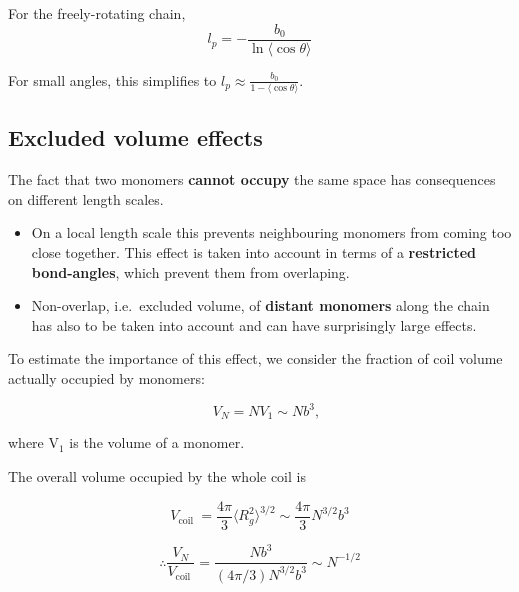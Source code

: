 \documentclass[
  letterpaper,
  enabledeprecatedfontcommands]{report}
\providecommand{\tightlist}{%
  \setlength{\itemsep}{0pt}\setlength{\parskip}{0pt}}
\begin{document}
For the freely-rotating chain, \[
l_p = -\frac{b_0}{\ln \langle \cos \theta \rangle}
\]

For small angles, this simplifies to
\(l_p \approx \frac{b_0}{1 - \langle \cos \theta \rangle}\).


\subsection{Excluded volume effects}\label{excluded-volume-effects}

The fact that two monomers \textbf{cannot occupy} the same space has
consequences on different length scales.

\begin{itemize}
\tightlist
\item
  On a local length scale this prevents neighbouring monomers from
  coming too close together. This effect is taken into account in terms
  of a \textbf{restricted bond-angles}, which prevent them from
  overlaping.
\item
  Non-overlap, i.e.~excluded volume, of \textbf{distant monomers} along
  the chain has also to be taken into account and can have surprisingly
  large effects.
\end{itemize}

To estimate the importance of this effect, we consider the fraction of
coil volume actually occupied by monomers:

\[\quad V_{N}=N V_{1} \sim N b^{3},\]

where \(\mathrm{V}_{1}\) is the volume of a monomer.

The overall volume occupied by the whole coil is

\[
V_{\text {coil }}=\frac{4 \pi}{3}\langle R_{g}^{2}\rangle^{3 / 2} \sim \frac{4 \pi}{3} N^{3 / 2} b^{3}
\]

\[\therefore \frac{V_{N}}{V_{\text {coil }}}=\frac{N b^{3}}{(4 \pi / 3) N^{3 / 2} b^{3}} \sim N^{-1 / 2}\]
\end{document}
